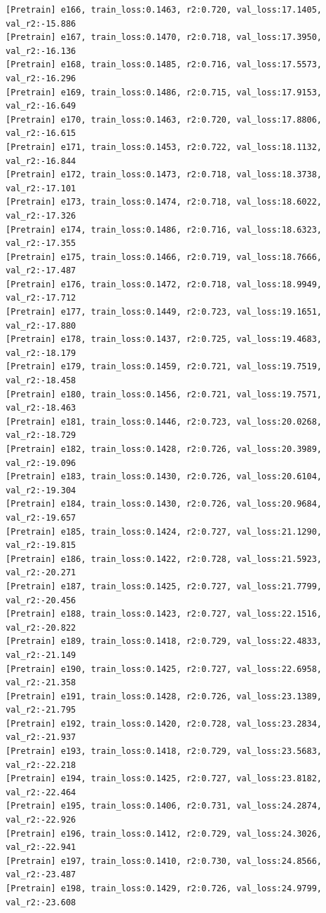 \documentclass[a4paper, 12pt]{article}
\begin{document}
\begin{lstlisting}
[Pretrain] e166, train_loss:0.1463, r2:0.720, val_loss:17.1405, val_r2:-15.886
[Pretrain] e167, train_loss:0.1470, r2:0.718, val_loss:17.3950, val_r2:-16.136
[Pretrain] e168, train_loss:0.1485, r2:0.716, val_loss:17.5573, val_r2:-16.296
[Pretrain] e169, train_loss:0.1486, r2:0.715, val_loss:17.9153, val_r2:-16.649
[Pretrain] e170, train_loss:0.1463, r2:0.720, val_loss:17.8806, val_r2:-16.615
[Pretrain] e171, train_loss:0.1453, r2:0.722, val_loss:18.1132, val_r2:-16.844
[Pretrain] e172, train_loss:0.1473, r2:0.718, val_loss:18.3738, val_r2:-17.101
[Pretrain] e173, train_loss:0.1474, r2:0.718, val_loss:18.6022, val_r2:-17.326
[Pretrain] e174, train_loss:0.1486, r2:0.716, val_loss:18.6323, val_r2:-17.355
[Pretrain] e175, train_loss:0.1466, r2:0.719, val_loss:18.7666, val_r2:-17.487
[Pretrain] e176, train_loss:0.1472, r2:0.718, val_loss:18.9949, val_r2:-17.712
[Pretrain] e177, train_loss:0.1449, r2:0.723, val_loss:19.1651, val_r2:-17.880
[Pretrain] e178, train_loss:0.1437, r2:0.725, val_loss:19.4683, val_r2:-18.179
[Pretrain] e179, train_loss:0.1459, r2:0.721, val_loss:19.7519, val_r2:-18.458
[Pretrain] e180, train_loss:0.1456, r2:0.721, val_loss:19.7571, val_r2:-18.463
[Pretrain] e181, train_loss:0.1446, r2:0.723, val_loss:20.0268, val_r2:-18.729
[Pretrain] e182, train_loss:0.1428, r2:0.726, val_loss:20.3989, val_r2:-19.096
[Pretrain] e183, train_loss:0.1430, r2:0.726, val_loss:20.6104, val_r2:-19.304
[Pretrain] e184, train_loss:0.1430, r2:0.726, val_loss:20.9684, val_r2:-19.657
[Pretrain] e185, train_loss:0.1424, r2:0.727, val_loss:21.1290, val_r2:-19.815
[Pretrain] e186, train_loss:0.1422, r2:0.728, val_loss:21.5923, val_r2:-20.271
[Pretrain] e187, train_loss:0.1425, r2:0.727, val_loss:21.7799, val_r2:-20.456
[Pretrain] e188, train_loss:0.1423, r2:0.727, val_loss:22.1516, val_r2:-20.822
[Pretrain] e189, train_loss:0.1418, r2:0.729, val_loss:22.4833, val_r2:-21.149
[Pretrain] e190, train_loss:0.1425, r2:0.727, val_loss:22.6958, val_r2:-21.358
[Pretrain] e191, train_loss:0.1428, r2:0.726, val_loss:23.1389, val_r2:-21.795
[Pretrain] e192, train_loss:0.1420, r2:0.728, val_loss:23.2834, val_r2:-21.937
[Pretrain] e193, train_loss:0.1418, r2:0.729, val_loss:23.5683, val_r2:-22.218
[Pretrain] e194, train_loss:0.1425, r2:0.727, val_loss:23.8182, val_r2:-22.464
[Pretrain] e195, train_loss:0.1406, r2:0.731, val_loss:24.2874, val_r2:-22.926
[Pretrain] e196, train_loss:0.1412, r2:0.729, val_loss:24.3026, val_r2:-22.941
[Pretrain] e197, train_loss:0.1410, r2:0.730, val_loss:24.8566, val_r2:-23.487
[Pretrain] e198, train_loss:0.1429, r2:0.726, val_loss:24.9799, val_r2:-23.608

\end{lstlisting}
\end{document}
